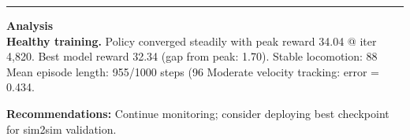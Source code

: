 \documentclass[a4paper,10pt]{article}
\begin{document}
\vspace{2pt}
\hrule
\vspace{2pt}

\footnotesize
\textbf{Analysis} \\[1pt]
\textbf{Healthy training.} Policy converged steadily with peak reward 34.04 @ iter 4,820.
Best model reward 32.34 (gap from peak: 1.70).
Stable locomotion: 88%
Mean episode length: 955/1000 steps (96%
Moderate velocity tracking: error = 0.434.

\textbf{Recommendations:}
Continue monitoring; consider deploying best checkpoint for sim2sim validation.
\end{document}
